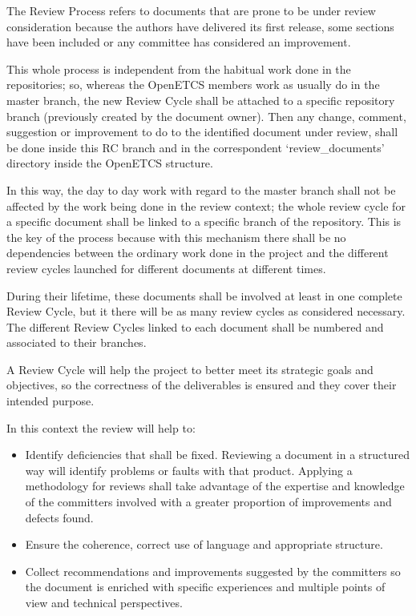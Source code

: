 \documentclass{template/openetcs_article}
\begin{document}
The Review Process refers to documents that are prone to be under review consideration because the authors have delivered its first release, some sections have been included or any committee has considered an improvement. 

This whole process is independent from the habitual work done in the repositories; so, whereas the OpenETCS members work as usually do in the master branch, the new Review Cycle shall be attached to a specific repository branch (previously created by the document owner). Then any change, comment, suggestion or improvement to do to the identified document under review, shall be done inside this RC branch and in the correspondent ‘review\_documents’ directory inside the OpenETCS structure. 

In this way, the day to day work with regard to the master branch shall not be affected by the work being done in the review context; the whole review cycle for a specific document shall be linked to a specific branch of the repository. 
This is the key of the process because with this mechanism there shall be no dependencies between the ordinary work done in the project and the different review cycles launched for different documents at different times.

During their lifetime, these documents shall be involved at least in one complete Review Cycle, but it there will be as many review cycles as considered necessary. The different Review Cycles linked to each document shall be numbered and associated to their branches.   

A Review Cycle will help the project to better meet its strategic goals and objectives, so the correctness of the deliverables is ensured and they cover their intended purpose.

In this context the review will help to:
\begin{itemize}
\item Identify deficiencies that shall be fixed. Reviewing a document in a structured way will identify problems or faults with that product. Applying a methodology for reviews shall take advantage of the expertise and knowledge of the committers involved with a greater proportion of improvements and defects found.
\item Ensure the coherence, correct use of language and appropriate structure.
\item Collect recommendations and improvements suggested by the committers so the document is enriched with specific experiences and multiple points of view and technical perspectives.
\end{itemize}
\end{document}
